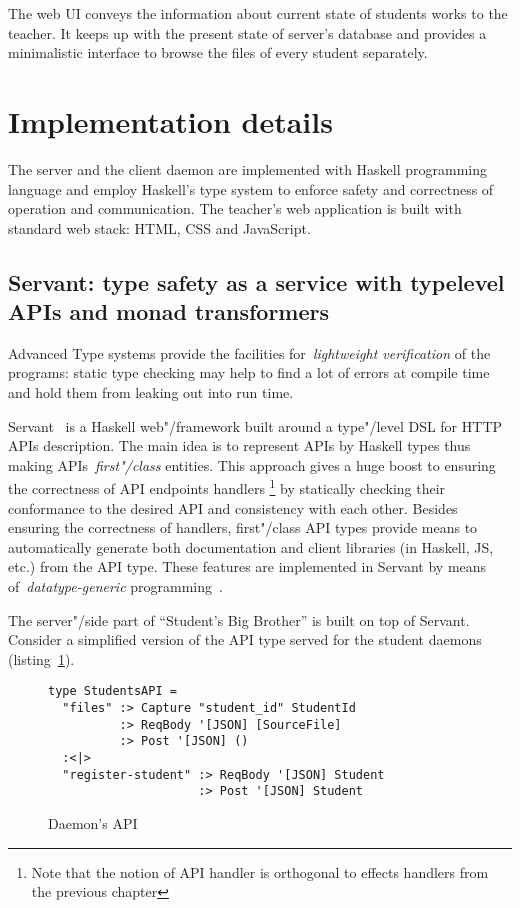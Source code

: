 The web UI conveys the information about current state of students works to the teacher.
It keeps up with the present state of server's database and provides a minimalistic
interface to browse the files of every student separately.

\section{Implementation details}

The server and the client daemon are implemented with Haskell programming language
and employ Haskell's type system to enforce safety and correctness of operation
and communication. The teacher's web application is built with standard web stack:
HTML, CSS and JavaScript.

\subsection{Servant: type safety as a service with typelevel APIs and monad transformers}

Advanced Type systems provide the facilities for~\emph{lightweight verification}
of the programs: static type checking may help to find a lot of errors at compile
time and hold them from leaking out into run time.

Servant~\cite{Mestanogullari:2015:TWA:2808098.2808099} is a Haskell web"/framework built
around a type"/level DSL for HTTP APIs description. The main idea is to represent
APIs by Haskell types thus making APIs~\emph{first"/class} entities. This approach
gives a huge boost to ensuring the correctness of API endpoints handlers
\footnote{Note that the notion of API handler is orthogonal to effects handlers
from the previous chapter} by statically
checking their conformance to the desired API and consistency with each other.
Besides ensuring the correctness of handlers, first"/class API types provide
means to automatically generate both documentation and client libraries (in Haskell,
JS, etc.) from the API type. These features are implemented in Servant by
means of~\emph{datatype-generic} programming~\cite{DBLP:conf/mpc/HoldermansJLR06}.

The server"/side part of ``Student's Big Brother'' is built on top of Servant. Consider a
simplified version of the API type served for the student daemons
(listing~\ref{listing:daemonAPI}).

\begin{figure}[h]
\begin{lstlisting}
type StudentsAPI =
  "files" :> Capture "student_id" StudentId
          :> ReqBody '[JSON] [SourceFile]
          :> Post '[JSON] ()
  :<|>
  "register-student" :> ReqBody '[JSON] Student
                     :> Post '[JSON] Student
\end{lstlisting}
\caption{Daemon's API}
\label{listing:daemonAPI}
\end{figure}

